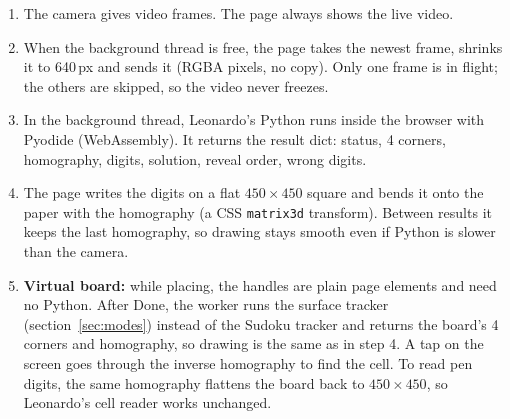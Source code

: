 \documentclass[11pt]{article}
\begin{document}
\begin{figure}[h]
\centering
{}
\end{figure}

\begin{enumerate}
  \item The camera gives video frames. The page always shows the live video.
  \item When the background thread is free, the page takes the newest frame, shrinks it to
        640\,px and sends it (RGBA pixels, no copy). Only one frame is in flight; the others are
        skipped, so the video never freezes.
  \item In the background thread, Leonardo's Python runs inside the browser with Pyodide
        (\mbox{WebAssembly}). It returns the result dict: status, 4 corners, homography, digits,
        solution, reveal order, wrong digits.
  \item The page writes the digits on a flat $450\times450$ square and bends it onto the paper with
        the homography (a CSS \texttt{matrix3d} transform). Between results it keeps the last
        homography, so drawing stays smooth even if Python is slower than the camera.
  \item \textbf{Virtual board:} while placing, the handles are plain page elements and need no
        Python. After Done, the worker runs the surface tracker (section~\ref{sec:modes}) instead of
        the Sudoku tracker and returns the board's 4 corners and homography, so drawing is the same
        as in step 4. A tap on the screen goes through the inverse homography to find the cell. To
        read pen digits, the same homography flattens the board back to $450\times450$, so
        Leonardo's cell reader works unchanged.
\end{enumerate}
\end{document}
